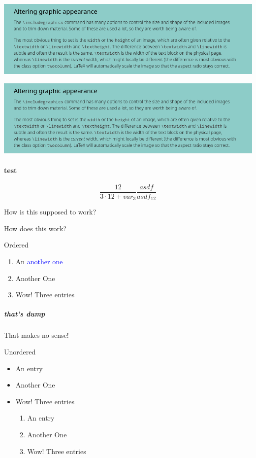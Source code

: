\documentclass[twocolumn, chapterprefix, headings=big, numbers=enddot, ngerman]{scrreprt}
\begin{document}
\begin{center}
  \includegraphics[width=0.95\linewidth]{./imgs/img.png}
\end{center}
\begin{center}
  \includegraphics[height=0.05\textheight]{./imgs/img.png}
\end{center}

\paragraph{test}

\[
\frac{12}{3 \cdot 12 + var_3}\frac{asdf}{asdf_{12}}
\]

How is this supposed to work?

How does this work?

Ordered
\begin{enumerate}
  \item An \textcolor{blue}{another one}
  \item Another One
  \item Wow! Three entries
\end{enumerate}

\subparagraph{that's dump}
That makes no sense!

Unordered
\begin{itemize}
  \item An entry
  \item Another One
  \item Wow! Three entries
  \begin{enumerate}
    \item An entry
    \item Another One
    \item Wow! Three entries
  \end{enumerate}
\end{itemize}
\end{document}
